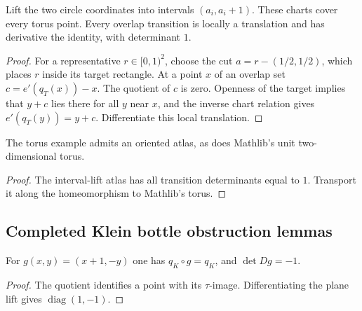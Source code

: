 \begin{lemma}\label{lem:torus-lift-atlas}

  Lift the two circle coordinates into intervals $(a_i,a_i+1)$. These
  charts cover every torus point. Every overlap transition is locally a
  translation and has derivative the identity, with determinant $1$.
\end{lemma}
\begin{proof}

  For a representative $r\in[0,1)^2$, choose the cut $a=r-(1/2,1/2)$,
  which places $r$ inside its target rectangle. At a point $x$ of an overlap
  set $c=e'(q_T(x))-x$. The quotient of $c$ is zero. Openness of the target
  implies that $y+c$ lies there for all $y$ near $x$, and the inverse chart
  relation gives $e'(q_T(y))=y+c$. Differentiate this local translation.
\end{proof}

\begin{proposition}\label{prop:torus-orientable}

  The torus example admits an oriented atlas, as does Mathlib's unit
  two-dimensional torus.
\end{proposition}
\begin{proof}

  The interval-lift atlas has all transition determinants equal to $1$.
  Transport it along the homeomorphism to Mathlib's torus.
\end{proof}

\subsection{Completed Klein bottle obstruction lemmas}

\begin{lemma}\label{lem:klein-twist}

  For $g(x,y)=(x+1,-y)$ one has $q_K\circ g=q_K$, and $\det Dg=-1$.
\end{lemma}
\begin{proof}

  The quotient identifies a point with its $\tau$-image. Differentiating
  the plane lift gives $\operatorname{diag}(1,-1)$.
\end{proof}

